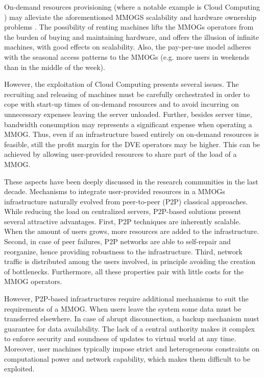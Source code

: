 \documentclass[final,10pt,a5paper]{phdimt}
\theoremstyle{definition}
\begin{document}
On-demand resources provisioning (where a notable example is Cloud Computing \cite{buyya2009cloud}) may alleviate the aforementioned MMOGS scalability and hardware ownership problems \cite{Nae2008, Nae2011}.
The possibility of renting machines lifts the MMOGs operators from the burden of buying and maintaining hardware, and offers the illusion of infinite machines, with good effects on scalability.
Also, the pay-per-use model adheres with the seasonal access patterns to the MMOGs (e.g. more users in weekends than in the middle of the week).


However, the exploitation of Cloud Computing presents several issues.
The recruiting and releasing of machines must be carefully orchestrated in order to cope with start-up times of on-demand resources and to avoid incurring on unnecessary expenses leaving the server unloaded.
Further, besides server time, bandwidth consumption may represents a significant expense
when operating a MMOG.
Thus, even if an infrastructure based entirely on on-demand resources is feasible, still the profit margin for the DVE operators may be higher. This can be achieved by allowing user-provided resources to share part of the load of a MMOG.


These aspects have been deeply discussed in the research communities in the last decade.
Mechanisms to integrate user-provided resources in a MMOGs infrastructure naturally evolved from peer-to-peer (P2P) classical approaches.
While reducing the load on centralized servers, P2P-based solutions present several attractive advantages.
First, P2P techniques are inherently scalable. When the amount of users grows, more resources are added to the infrastructure. Second, in case of peer failures, P2P networks are able to self-repair and reorganize, hence providing robustness to the infrastructure. 
Third, network traffic is distributed among the users involved, in principle avoiding the creation of bottlenecks.
Furthermore, all these properties pair with little costs for the MMOG operators. 

However, P2P-based infrastructures require additional mechanisms to suit the requirements of a MMOG.
When users leave the system some data must be transferred elsewhere.
In case of abrupt disconnection, a backup mechanism must guarantee for data availability.
The lack of a central authority makes it complex to enforce security and soundness of updates to virtual world at any time. 
Moreover, user machines typically impose strict and heterogeneous constraints on computational power and network capability, which makes them difficult to be exploited.
\end{document}
